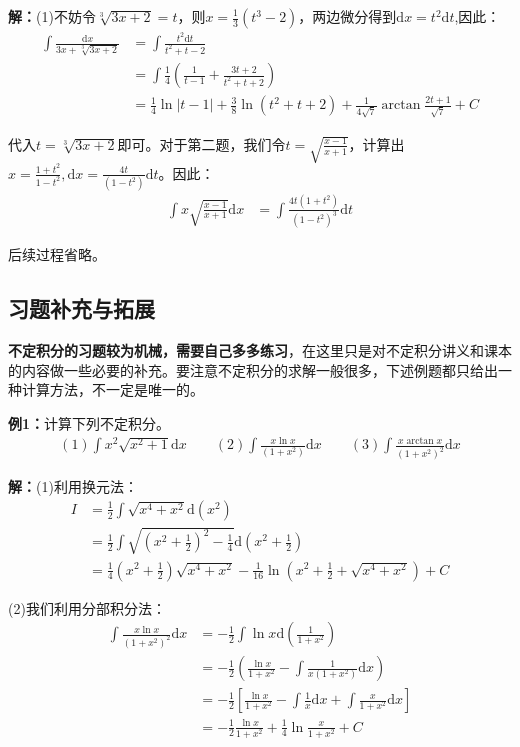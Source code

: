 \documentclass{ctexart}
\let\oldtextbf\textbf %
\renewcommand{\textbf}[1]{\textcolor{btex}{\oldtextbf{#1}}} %
\begin{document}
\textbf{解：}(1)不妨令$\sqrt[3]{3x+2}=t$，则$x=\frac{1}{3}(t^3-2)$，两边微分得到$\mathrm{d}x=t^2\mathrm{d}t$,因此：
\begin{align*}
    \int\frac{\mathrm{d}x}{3x+\sqrt[3]{3x+2}}&=\int\frac{t^2\mathrm{d}t}{t^2+t-2}\\
    &=\int\frac{1}{4}(\frac{1}{t-1}+\frac{3t+2}{t^2+t+2})\\
    &=\frac{1}{4}\ln|t-1|+\frac{3}{8}\ln(t^2+t+2)+\frac{1}{4\sqrt{7}}\arctan\frac{2t+1}{\sqrt{7}}+C
\end{align*}

代入$t=\sqrt[3]{3x+2}$即可。对于第二题，我们令$t=\sqrt{\frac{x-1}{x+1}}$，计算出$x=\frac{1+t^2}{1-t^2},\mathrm{d}x=\frac{4t}{(1-t^2)}\mathrm{d}t$。因此：
\begin{align*}
    \int x\sqrt{\frac{x-1}{x+1}}\mathrm{d}x&=\int\frac{4t(1+t^2)}{(1-t^2)^3}\mathrm{d}t
\end{align*}

后续过程省略。

\subsection{习题补充与拓展}
\textbf{不定积分的习题较为机械，需要自己多多练习}，在这里只是对不定积分讲义和课本的内容做一些必要的补充。要注意不定积分的求解一般很多，下述例题都只给出一种计算方法，不一定是唯一的。

\textbf{例1：}计算下列不定积分。
\begin{align*}
    (1)\int x^2\sqrt{x^2+1}\mathrm{d}x\qquad (2)\int \frac{x\ln x}{(1+x^2)}\mathrm{d}x \qquad (3)\int\frac{x\arctan x}{(1+x^2)^2}\mathrm{d}x
\end{align*}

\textbf{解：}(1)利用换元法：
\begin{align*}
    I&=\frac{1}{2}\int\sqrt{x^4+x^2}\mathrm{d}(x^2)\\
    &=\frac{1}{2}\int\sqrt{(x^2+\frac{1}{2})^2-\frac{1}{4}}\mathrm{d}(x^2+\frac{1}{2})\\
    &=\frac{1}{4}(x^2+\frac{1}{2})\sqrt{x^4+x^2}-\frac{1}{16}\ln(x^2+\frac{1}{2}+\sqrt{x^4+x^2})+C
\end{align*}

(2)我们利用分部积分法：
\begin{align*}
    \int\frac{x\ln x}{(1+x^2)^2}\mathrm{d}x&=-\frac{1}{2}\int \ln x\mathrm{d}(\frac{1}{1+x^2})\\
    &=-\frac{1}{2}(\frac{\ln x}{1+x^2}-\int\frac{1}{x(1+x^2)}\mathrm{d}x)\\
    &=-\frac{1}{2}\left[\frac{\ln x}{1+x^2}-\int\frac{1}{x}\mathrm{d}x+\int\frac{x}{1+x^2}\mathrm{d}x\right]\\
    &=-\frac{1}{2}\frac{\ln x}{1+x^2}+\frac{1}{4}\ln \frac{x}{1+x^2}+C
\end{align*}
\end{document}
